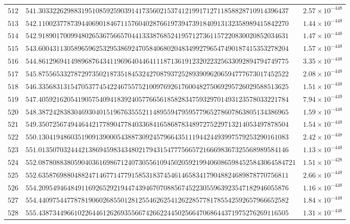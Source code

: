 \documentclass[12pt,reqno]{amsart}
\theoremstyle{remark}
\begin{document}
\begin{longtable}{clc}
$512$ & $541.3033226298831951085925903914173560215374121991712711858828710914396437$ & $2.57\times 10^{-448}$ \\
$513$ & $542.1100237787394406901846711576040287661973947391840913132358989415842270$ & $1.44\times 10^{-448}$ \\
$514$ & $542.9189017009948026536756657044133387685241957127361157220830020852034631$ & $1.47\times 10^{-448}$ \\
$515$ & $543.6004311305896596253295386924705840680204834992796547490187415353278204$ & $1.57\times 10^{-448}$ \\
$516$ & $544.8612969414989687643411969640446411187136191232022325633092894794749775$ & $3.35\times 10^{-448}$ \\
$517$ & $545.8755653327872973502187351845324270879372528939096206594777673017452522$ & $2.08\times 10^{-448}$ \\
$518$ & $546.3356831315470537745422467557521009769261760048275069295726029588513625$ & $1.51\times 10^{-448}$ \\
$519$ & $547.4059216205419057540941839240577665618582834759329701493123578033221784$ & $7.94\times 10^{-449}$ \\
$520$ & $548.3872428383046930401519676355521148955947959577965278607863805134386965$ & $1.59\times 10^{-448}$ \\
$521$ & $549.3507256749446442177890477840336841658687834897275229713214053497878504$ & $1.54\times 10^{-448}$ \\
$522$ & $550.1304194860351909139000543887309245796643511194424493997579253290161083$ & $2.42\times 10^{-448}$ \\
$523$ & $551.0135070324442138694598343480217943154777566572166698367325568989584146$ & $1.13\times 10^{-448}$ \\
$524$ & $552.087808838059040361698671240730556109450205921994060865984525843064584721$ & $1.51\times 10^{-428}$ \\
$525$ & $552.6358769880488247146771477915853183745461465834179048824689878770756811$ & $2.66\times 10^{-448}$ \\
$526$ & $554.2095494648491169265292194474394670708856745223055963923547182946055876$ & $1.16\times 10^{-448}$ \\
$527$ & $554.4409754477878190602685501281255462625412622857781785542592657966652582$ & $1.84\times 10^{-448}$ \\
$528$ & $555.4387344966102264461262693556674266224450256647068644371975276269116505$ & $1.31\times 10^{-448}$ \\

\end{longtable}
\end{document}
